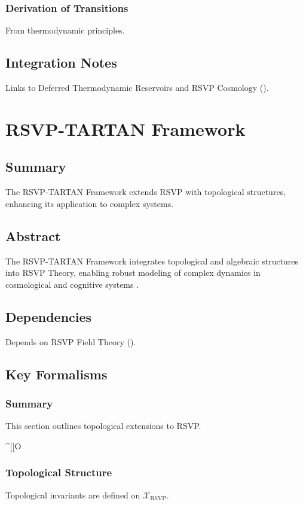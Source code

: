 \documentclass[11pt,oneside]{memoir}
\theoremstyle{plain}
\newcommand{\X}{\mathcal{X}}
\begin{document}
\subsection{Derivation of Transitions}
From thermodynamic principles.

\section{Integration Notes}
Links to Deferred Thermodynamic Reservoirs and RSVP Cosmology ().

\chapter{RSVP-TARTAN Framework}
\label{sec:rsvp_tartan}

\section{Summary}
The RSVP-TARTAN Framework extends RSVP with topological structures, enhancing its application to complex systems.

\section{Abstract}
The RSVP-TARTAN Framework integrates topological and algebraic structures into RSVP Theory, enabling robust modeling of complex dynamics in cosmological and cognitive systems \cite{lurie}.

\section{Dependencies}
Depends on RSVP Field Theory ().

\section{Key Formalisms}
\subsection{Summary}
This section outlines topological extensions to RSVP.

^[[O\subsection{Topological Structure}
Topological invariants are defined on \(\X_{\mathrm{RSVP}}\).
\end{document}
